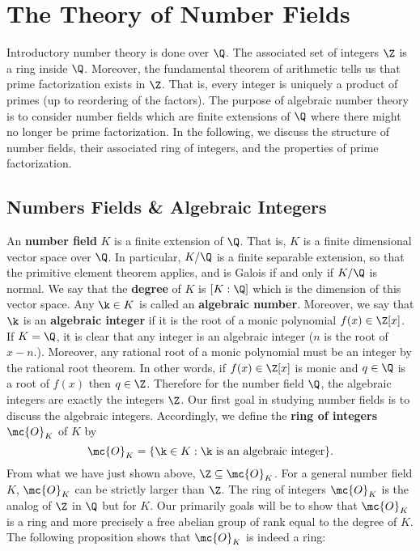 \chapter{The Theory of Number Fields}
  Introductory number theory is done over $\Q$. The associated set of integers $\Z$ is a ring inside $\Q$. Moreover, the fundamental theorem of arithmetic tells us that prime factorization exists in $\Z$. That is, every integer is uniquely a product of primes (up to reordering of the factors). The purpose of algebraic number theory is to consider number fields which are finite extensions of $\Q$ where there might no longer be prime factorization. In the following, we discuss the structure of number fields, their associated ring of integers, and the properties of prime factorization.
  \section{Numbers Fields \& Algebraic Integers}
    An \textbf{number field} $K$ is a finite extension of $\Q$. That is, $K$ is a finite dimensional vector space over $\Q$. In particular, $K/\Q$ is a finite separable extension, so that the primitive element theorem applies, and is Galois if and only if $K/\Q$ is normal. We say that the \textbf{degree} of $K$ is $[K:\Q]$ which is the dimension of this vector space. Any $\k \in K$ is called an \textbf{algebraic number}. Moreover, we say that $\k$ is an \textbf{algebraic integer} if it is the root of a monic polynomial $f(x) \in \Z[x]$. If $K = \Q$, it is clear that any integer is an algebraic integer ($n$ is the root of $x-n$.). Moreover, any rational root of a monic polynomial must be an integer by the rational root theorem. In other words, if $f(x) \in \Z[x]$ is monic and $q \in \Q$ is a root of $f(x)$ then $q \in \Z$. Therefore for the number field $\Q$, the algebraic integers are exactly the integers $\Z$. Our first goal in studying number fields is to discuss the algebraic integers. Accordingly, we define the \textbf{ring of integers} $\mc{O}_{K}$ of $K$ by
    \[
      \mc{O}_{K} = \{\k \in K:\text{$\k$ is an algebraic integer}\}.
    \]
    From what we have just shown above, $\Z \subseteq \mc{O}_{K}$. For a general number field $K$, $\mc{O}_{K}$ can be strictly larger than $\Z$. The ring of integers $\mc{O}_{K}$ is the analog of $\Z$ in $\Q$ but for $K$. Our primarily goals will be to show that $\mc{O}_{K}$ is a ring and more precisely a free abelian group of rank equal to the degree of $K$. The following proposition shows that $\mc{O}_{K}$ is indeed a ring:

